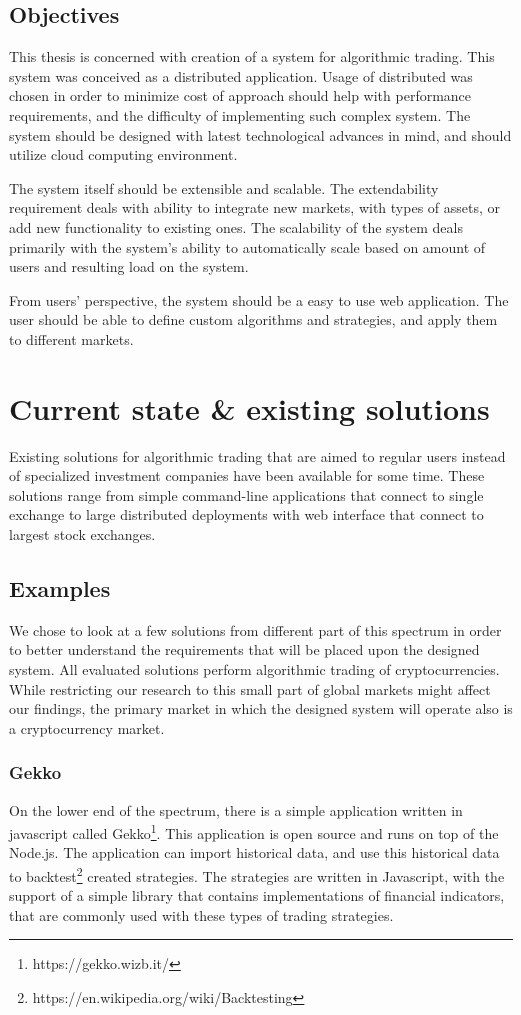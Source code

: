 \section{Objectives}
This thesis is concerned with creation of a system for algorithmic trading. This system was conceived
as a distributed application. Usage of distributed was chosen in order to minimize cost of
approach should help with performance requirements,
and the difficulty of implementing such complex system. The system should be designed with latest technological advances in mind, and
should utilize cloud computing environment.

The system itself should be extensible and scalable. The extendability requirement deals with ability to integrate new markets,
with types of assets, or add new functionality to existing ones. The scalability of the system deals primarily with the system's
ability to automatically scale based on amount of users and resulting load on the system.

From users' perspective, the system should be a easy to use web application. The user should be able to define custom
algorithms and strategies, and apply them to different markets.

\chapter{Current state \& existing solutions}
\label{chapter:current_state}
Existing solutions for algorithmic trading that are aimed to regular users instead of specialized investment companies
have been available for some time. These solutions range from simple command-line applications that connect to single exchange
to large distributed deployments with web interface that connect to largest stock exchanges\cite{Agopyan_financialbusiness}.

\section{Examples}
We chose to look at a few solutions from different part of this spectrum in order to better understand the requirements
that will be placed upon the designed system. All evaluated solutions perform algorithmic trading of cryptocurrencies.
While restricting our research to this small part of global markets might affect our findings, the primary
market in which the designed system will operate also is a cryptocurrency market.

\subsection{Gekko}
On the lower end of the spectrum, there is a simple application written in javascript called Gekko\footnote{https://gekko.wizb.it/}.
This application is open source and runs on top of the Node.js. The application can import historical data,
and use this historical data to backtest\footnote{https://en.wikipedia.org/wiki/Backtesting} created strategies. The strategies are written in Javascript, with the support
of a simple library that contains implementations of financial indicators, that are commonly used with these types
of trading strategies.

